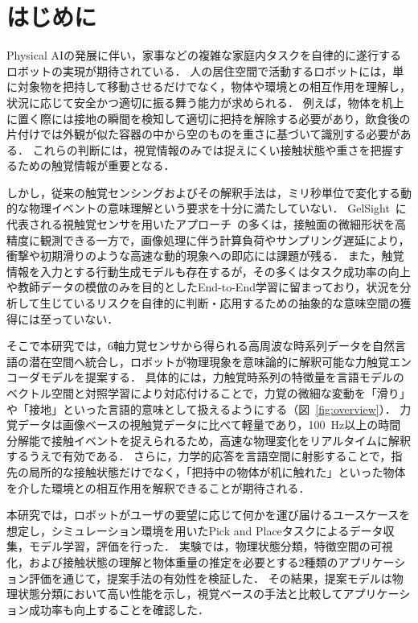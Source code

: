 \documentclass[Japanese]{dicomopapers}
\begin{document}
\section{はじめに}
Physical AIの発展に伴い，家事などの複雑な家庭内タスクを自律的に遂行するロボットの実現が期待されている．
人の居住空間で活動するロボットには，単に対象物を把持して移動させるだけでなく，物体や環境との相互作用を理解し，状況に応じて安全かつ適切に振る舞う能力が求められる．
例えば，物体を机上に置く際には接地の瞬間を検知して適切に把持を解除する必要があり，飲食後の片付けでは外観が似た容器の中から空のものを重さに基づいて識別する必要がある．
これらの判断には，視覚情報のみでは捉えにくい接触状態や重さを把握するための触覚情報が重要となる．

しかし，従来の触覚センシングおよびその解釈手法は，ミリ秒単位で変化する動的な物理イベントの意味理解という要求を十分に満たしていない．
GelSight~\cite{GelSight}に代表される視触覚センサを用いたアプローチ~\cite{BindingTouch, CLTP, octo}の多くは，接触面の微細形状を高精度に観測できる一方で，画像処理に伴う計算負荷やサンプリング遅延により，衝撃や初期滑りのような高速な動的現象への即応には課題が残る．
また，触覚情報を入力とする行動生成モデル\cite{VTLA, tactilevla, ForceVLA}も存在するが，その多くはタスク成功率の向上や教師データの模倣のみを目的としたEnd-to-End学習に留まっており，状況を分析して生じているリスクを自律的に判断・応用するための抽象的な意味空間の獲得には至っていない．

そこで本研究では，6軸力覚センサから得られる高周波な時系列データを自然言語の潜在空間へ統合し，ロボットが物理現象を意味論的に解釈可能な力触覚エンコーダモデルを提案する．
具体的には，力触覚時系列の特徴量を言語モデルのベクトル空間と対照学習により対応付けることで，力覚の微細な変動を「滑り」や「接地」といった言語的意味として扱えるようにする（図~\ref{fig:overview}）．
力覚データは画像ベースの視触覚データに比べて軽量であり，\qty{100}{\Hz}以上の時間分解能で接触イベントを捉えられるため，高速な物理変化をリアルタイムに解釈するうえで有効である．
さらに，力学的応答を言語空間に射影することで，指先の局所的な接触状態だけでなく，「把持中の物体が机に触れた」といった物体を介した環境との相互作用を解釈できることが期待される．

本研究では，ロボットがユーザの要望に応じて何かを運び届けるユースケースを想定し，シミュレーション環境を用いたPick and Placeタスクによるデータ収集，モデル学習，評価を行った．
実験では，物理状態分類，特徴空間の可視化，および接触状態の理解と物体重量の推定を必要とする2種類のアプリケーション評価を通じて，提案手法の有効性を検証した．
その結果，提案モデルは物理状態分類において高い性能を示し，視覚ベースの手法と比較してアプリケーション成功率も向上することを確認した．
\end{document}
